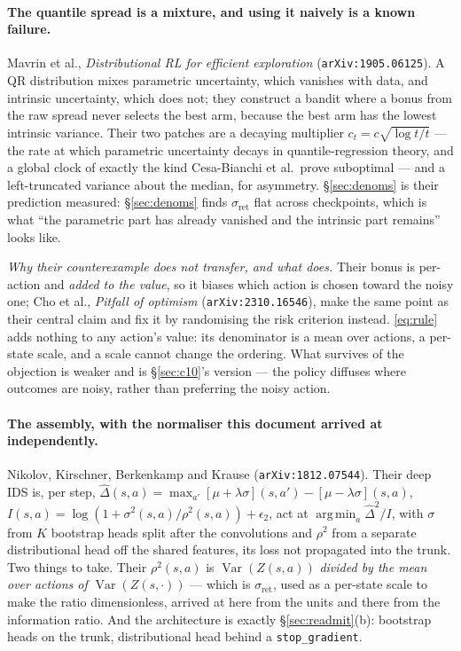 \documentclass{article}
\DeclareMathOperator*{\argmin}{arg\,min}
\DeclareMathOperator{\Var}{Var}
\newcommand{\sret}{\sigma_{\mathrm{ret}}}
\begin{document}
\paragraph{The quantile spread is a mixture, and using it naively is a known failure.} Mavrin
et al., \emph{Distributional RL for efficient exploration} (\texttt{arXiv:1905.06125}). A QR
distribution mixes parametric uncertainty, which vanishes with data, and intrinsic uncertainty,
which does not; they construct a bandit where a bonus from the raw spread never selects the best
arm, because the best arm has the lowest intrinsic variance. Their two patches are a decaying
multiplier $c_t = c\sqrt{\log t/t}$ --- the rate at which parametric uncertainty decays in
quantile-regression theory, and a global clock of exactly the kind Cesa-Bianchi et al.\ prove
suboptimal --- and a left-truncated variance about the median, for asymmetry. \S\ref{sec:denoms}
is their prediction measured: \S\ref{sec:denoms} finds $\sret$ flat across checkpoints, which
is
what ``the parametric part has already vanished and the intrinsic part remains'' looks like.

\emph{Why their counterexample does not transfer, and what does.} Their bonus is per-action and
\emph{added to the value}, so it biases which action is chosen toward the noisy one; Cho et al.,
\emph{Pitfall of optimism} (\texttt{arXiv:2310.16546}), make the same point as their central
claim and fix it by randomising the risk criterion instead. \eqref{eq:rule} adds nothing to any
action's value: its denominator is a mean over actions, a per-state scale, and a scale cannot
change the ordering. What survives of the objection is weaker and is \S\ref{sec:c10}'s version
--- the policy diffuses where outcomes are noisy, rather than preferring the noisy action.

\paragraph{The assembly, with the normaliser this document arrived at independently.} Nikolov,
Kirschner, Berkenkamp and Krause (\texttt{arXiv:1812.07544}). Their deep IDS is, per step,
$\hat\Delta(s,a) = \max_{a'}[\mu + \lambda\sigma](s,a') - [\mu - \lambda\sigma](s,a)$,
$I(s,a) = \log(1 + \sigma^2(s,a)/\rho^2(s,a)) + \epsilon_2$, act at $\argmin_a \hat\Delta^2/I$,
with $\sigma$ from $K$ bootstrap heads split after the convolutions and $\rho^2$ from a separate
distributional head off the shared features, its loss not propagated into the trunk. Two things
to take. Their $\rho^2(s,a)$ is $\Var(Z(s,a))$ \emph{divided by the mean over actions of
$\Var(Z(s,\cdot))$} --- which is $\sret$, used as a per-state scale to make the ratio
dimensionless, arrived at here from the units and there from the information ratio. And the
architecture is exactly \S\ref{sec:readmit}(b): bootstrap heads on the trunk, distributional head
behind a \texttt{stop\_gradient}.
\end{document}
